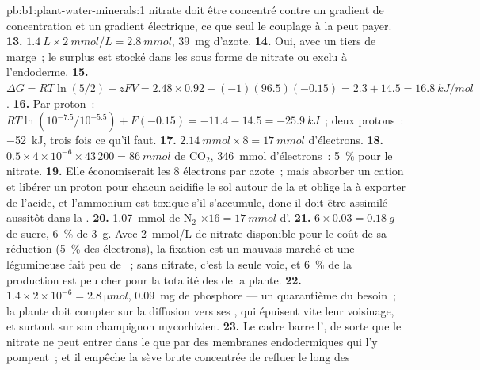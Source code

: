 \begin{solution}{pb:b1:plant-water-minerals:1}
nitrate doit être concentré contre un gradient de concentration et un
gradient électrique, ce que seul le couplage à la  peut
payer.
\textbf{13.} $\qty{1.4}{L}\times\qty{2}{mmol/L} = \qty{2.8}{mmol}$,
\qty{39}{mg} d'azote.
\textbf{14.} Oui, avec un tiers de marge~; le surplus est stocké dans
les  sous forme de nitrate ou exclu à l'endoderme.
\textbf{15.} $\Delta G = RT\ln(5/2) + zFV = 2.48\times 0.92 + (-1)(96.5)(-0.15)
= 2.3 + 14.5 = \qty{16.8}{kJ/mol}$.
\textbf{16.} Par proton~: $RT\ln(10^{-7.5}/10^{-5.5}) + F(-0.15) =
-11.4 - 14.5 = \qty{-25.9}{kJ}$~; deux protons~: \qty{-52}{kJ}, trois
fois ce qu'il faut.
\textbf{17.} $\qty{2.14}{mmol}\times 8 = \qty{17}{mmol}$ d'électrons.
\textbf{18.} $0.5\times 4\times 10^{-6}\times 43\,200 = \qty{86}{mmol}$
de $\mathrm{CO_2}$, \qty{346}{mmol} d'électrons~: \qty{5}{\%} pour le
nitrate.
\textbf{19.} Elle économiserait les 8 électrons par azote~; mais
absorber un cation et libérer un proton pour chacun acidifie le sol
autour de la  et oblige la  à exporter de l'acide, et
l'ammonium est toxique s'il s'accumule, donc il doit être assimilé
aussitôt dans la .
\textbf{20.} \qty{1.07}{mmol} de $\mathrm{N_2}$ $\times 16 =
\qty{17}{mmol}$ d'.
\textbf{21.} $6\times 0.03 = \qty{0.18}{g}$ de sucre, \qty{6}{\%} de
\qty{3}{g}. Avec \qty{2}{mmol/L} de nitrate disponible pour le coût de
sa réduction (\qty{5}{\%} des électrons), la fixation est un mauvais
marché et une légumineuse fait peu de ~; sans nitrate, c'est
la seule voie, et \qty{6}{\%} de la production est peu cher pour la
totalité des  de la plante.
\textbf{22.} $1.4\times 2\times 10^{-6} = \qty{2.8}{\micro mol}$,
\qty{0.09}{mg} de phosphore --- un quarantième du besoin~; la plante
doit compter sur la diffusion vers ses , qui épuisent
vite leur voisinage, et surtout sur son champignon mycorhizien.
\textbf{23.} Le cadre barre l', de sorte que le nitrate ne
peut entrer dans le  que par des membranes endodermiques qui l'y
pompent~; et il empêche la sève brute concentrée de refluer le long des

\end{solution}

